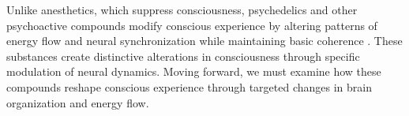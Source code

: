 Unlike anesthetics, which suppress consciousness, psychedelics and other psychoactive compounds modify conscious experience by altering patterns of energy flow and neural synchronization while maintaining basic coherence \cite{John2005}. These substances create distinctive alterations in consciousness through specific modulation of neural dynamics. Moving forward, we must examine how these compounds reshape conscious experience through targeted changes in brain organization and energy flow.
